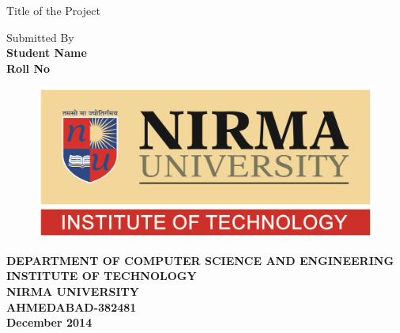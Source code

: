 
\thispagestyle{empty}
\begin{center}
{\huge Title of the Project }\vspace{.05in}\\

\vspace{4cm}

Submitted By\\
{\large \bf Student Name} \\
{\bf Roll No} \\
\vspace{10cm}



\begin{figure}[h]
\begin{center}
  \includegraphics [scale=0.7]{NU_IT_Color_Max.png}\\
\end{center}
\end{figure}

\vspace{-0.5cm}
{\bf DEPARTMENT OF COMPUTER SCIENCE AND ENGINEERING}\\
{\bf INSTITUTE OF TECHNOLOGY}\\
{\bf NIRMA UNIVERSITY}\\
{\bf AHMEDABAD-382481}\\
{\bf December 2014}
\end{center}


